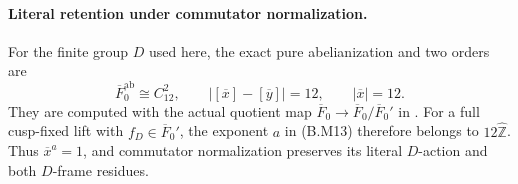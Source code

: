 \paragraph{Literal retention under commutator normalization.}
For the finite group $D$ used here, the exact pure
abelianization and two orders are
\[
 \overline F_0^{\mathrm{ab}}\cong C_{12}^2,
 \qquad |[\overline x]-[\overline y]|=12,
 \qquad |\overline x|=12.                       \tag{B.M17}
\]
They are computed with the actual quotient map
$\overline F_0\to\overline F_0/\overline F_0'$
in .
For a full cusp-fixed lift with $f_D\in\overline F_0'$,
the exponent $a$ in (B.M13) therefore belongs to
$12\widehat{\mathbb Z}$.  Thus $\overline x^a=1$,
and commutator normalization preserves its literal
$D$-action and both $D$-frame residues.
